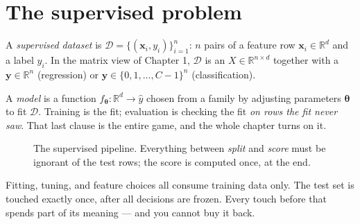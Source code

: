 \section{The supervised problem}\label{sec:supervised}

\begin{definition}\label{def:supervised}
A \emph{supervised dataset} is
$\mathcal D = \{(\mathbf{x}_i, y_i)\}_{i=1}^{n}$: $n$ pairs of a feature row
$\mathbf{x}_i \in \mathbb{R}^d$ and a label $y_i$. In the matrix view of
Chapter 1, $\mathcal D$ is an $X \in \mathbb{R}^{n\times d}$ together with a
$\mathbf{y} \in \mathbb{R}^{n}$ (regression) or $\mathbf{y} \in
\{0,1,\dots,C{-}1\}^{n}$ (classification).
\end{definition}

A \emph{model} is a function
$f_{\boldsymbol\theta}: \mathbb{R}^d \to \hat{y}$ chosen from a family by
adjusting parameters $\boldsymbol\theta$ to fit $\mathcal D$. Training is the
fit; evaluation is checking the fit \emph{on rows the fit never saw}. That
last clause is the entire game, and the whole chapter turns on it.

\begin{figure}[ht]\centering
{}
\caption{The supervised pipeline. Everything between \emph{split} and
\emph{score} must be ignorant of the test rows; the score is computed once,
at the end.}\label{fig:pipeline}
\end{figure}

\begin{principle}
Fitting, tuning, and feature choices all consume training
data only. The test set is touched exactly once, after all decisions are
frozen. Every touch before that spends part of its meaning --- and you cannot
buy it back.
\end{principle}

